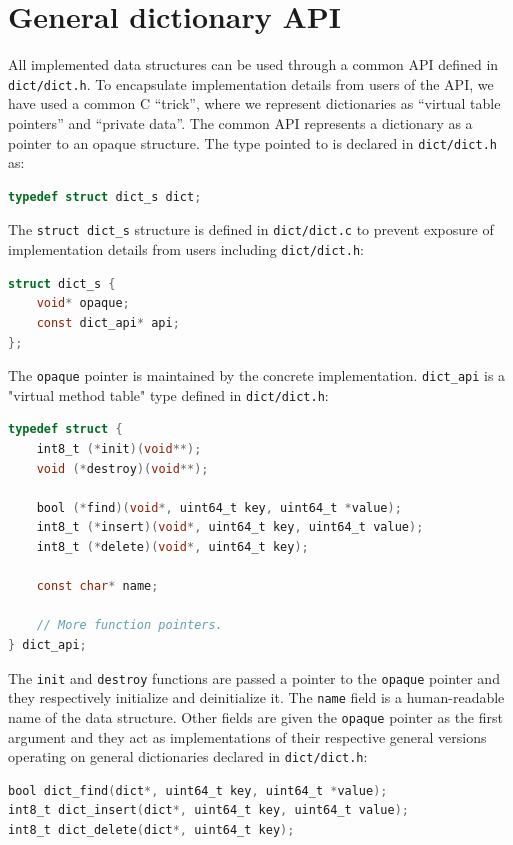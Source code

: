 \section{General dictionary API}
All implemented data structures can be used through a common API defined
in \texttt{dict/dict.h}. To encapsulate implementation details from
users of the API, we have used a common C ``trick'', where we represent
dictionaries as ``virtual table pointers'' and ``private data''.
The common API represents a dictionary as a pointer to an opaque structure.
The type pointed to is declared in \texttt{dict/dict.h} as:
\begin{lstlisting}[language=C]
typedef struct dict_s dict;
\end{lstlisting}

The \texttt{struct dict\_s} structure is defined in \texttt{dict/dict.c}
to prevent exposure of implementation details from users including
\texttt{dict/dict.h}:
\begin{lstlisting}[language=C]
struct dict_s {
	void* opaque;
	const dict_api* api;
};
\end{lstlisting}

The \texttt{opaque} pointer is maintained by the concrete implementation.
\texttt{dict\_api} is a "virtual method table" type defined in
\texttt{dict/dict.h}:

\begin{lstlisting}[language=C]
typedef struct {
	int8_t (*init)(void**);
	void (*destroy)(void**);

	bool (*find)(void*, uint64_t key, uint64_t *value);
	int8_t (*insert)(void*, uint64_t key, uint64_t value);
	int8_t (*delete)(void*, uint64_t key);

	const char* name;

	// More function pointers.
} dict_api;
\end{lstlisting}

The \texttt{init} and \texttt{destroy} functions are passed a pointer to the
\texttt{opaque} pointer and they respectively initialize and deinitialize it.
The \texttt{name} field is a human-readable name of the data structure.
Other fields are given the \texttt{opaque} pointer as the first argument
and they act as implementations of their respective general versions operating
on general dictionaries declared in \texttt{dict/dict.h}:

\begin{lstlisting}[language=C]
bool dict_find(dict*, uint64_t key, uint64_t *value);
int8_t dict_insert(dict*, uint64_t key, uint64_t value);
int8_t dict_delete(dict*, uint64_t key);
\end{lstlisting}


